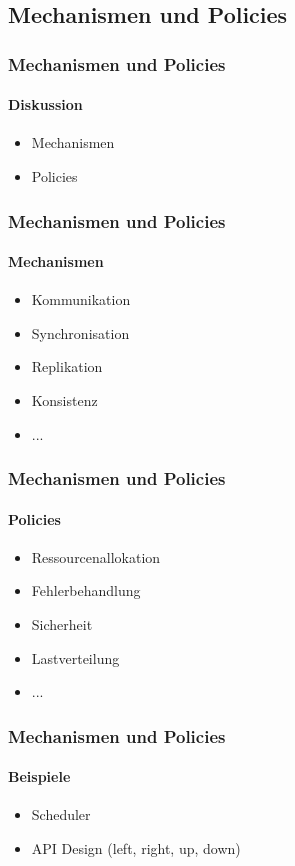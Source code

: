 \subsection{Mechanismen und Policies}
\begin{frame}
  \frametitle{Mechanismen und Policies}
  \framesubtitle{Diskussion}
  \begin{itemize}
    \item Mechanismen
    \item Policies
  \end{itemize}
\end{frame}

\begin{frame}
  \frametitle{Mechanismen und Policies}
  \framesubtitle{Mechanismen}
  \begin{itemize}
    \item Kommunikation
    \item Synchronisation
    \item Replikation
    \item Konsistenz
    \item ...
  \end{itemize}
\end{frame}

\begin{frame}
  \frametitle{Mechanismen und Policies}
  \framesubtitle{Policies}
  \begin{itemize}
    \item Ressourcenallokation
    \item Fehlerbehandlung
    \item Sicherheit
    \item Lastverteilung
    \item ...
  \end{itemize}
\end{frame}

\begin{frame}
  \frametitle{Mechanismen und Policies}
  \framesubtitle{Beispiele}
  \begin{itemize}
    \item Scheduler
    \item API Design (left, right, up, down)
  \end{itemize}
\end{frame}